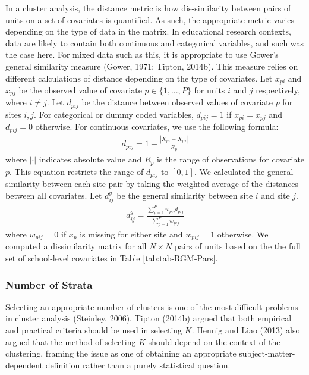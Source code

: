 \documentclass[
  man,floatsintext]{apa6}
\begin{document}
In a cluster analysis, the distance metric is how dis-similarity between pairs of units on a set of covariates is quantified. As such, the appropriate metric varies depending on the type of data in the matrix.
In educational research contexts, data are likely to contain both continuous and categorical variables, and such was the case here. For mixed data such as this, it is appropriate to use Gower's general similarity measure (Gower, 1971; Tipton, 2014b). This measure relies on different calculations of distance depending on the type of covariates. Let \(x_{pi}\) and \(x_{pj}\) be the observed value of covariate \(p \in \{1, ..., P\}\) for units \(i\) and \(j\) respectively, where \(i \ne j\). Let \(d_{pij}\) be the distance between observed values of covariate \(p\) for sites \(i,j\). For categorical or dummy coded variables, \(d_{pij} = 1\) if \(x_{pi} = x_{pj}\) and \(d_{pij} = 0\) otherwise. For continuous covariates, we use the following formula:
\begin{align}
\label{eq:gowerdist-p}
d_{pij} = 1 - \frac{|X_{pi} - X_{pj}|}{R_p}
\end{align}
where \(|\cdot|\) indicates absolute value and \(R_p\) is the range of observations for covariate \(p\). This equation restricts the range of \(d_{pij}\) to \([0,1]\). We calculated the general similarity between each site pair by taking the weighted average of the distances between all covariates. Let \(d^{g}_{ij}\) be the general similarity between site \(i\) and site \(j\).
\begin{align}
\label{eq:gowerdist}
d^{g}_{ij} = \frac{\sum^P_{p = 1} w_{pij} d_{pij}}{\sum^P_{p = 1} w_{pij}}
\end{align}
where \(w_{pij} = 0\) if \(x_p\) is missing for either site and \(w_{pij} = 1\) otherwise.
We computed a dissimilarity matrix for all \(N \times N\) pairs of units based on the the full set of school-level covariates in Table \ref{tab:tab-RGM-Pars}.

\hypertarget{number-of-strata}{%
\subsubsection{Number of Strata}\label{number-of-strata}}

Selecting an appropriate number of clusters is one of the most difficult problems in cluster analysis (Steinley, 2006). Tipton (2014b) argued that both empirical and practical criteria should be used in selecting \(K\). Hennig and Liao (2013) also argued that the method of selecting \(K\) should depend on the context of the clustering, framing the issue as one of obtaining an appropriate subject-matter-dependent definition rather than a purely statistical question.
\end{document}
